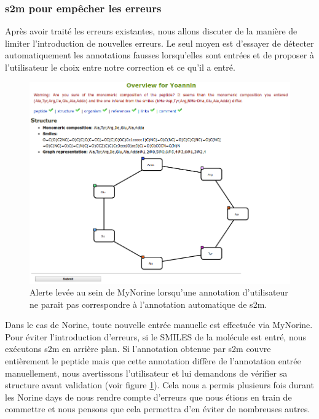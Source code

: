 \subsubsection{s2m pour empêcher les erreurs}

Après avoir traité les erreurs existantes, nous allons discuter de la manière de limiter l'introduction de nouvelles erreurs.
Le seul moyen est d'essayer de détecter automatiquement les annotations fausses lorsqu'elles sont entrées et de proposer à l'utilisateur le choix entre notre correction et ce qu'il a entré.

\begin{figure}[h!]
  \begin{center}
    \includegraphics[width=450px]{Figures/contributions/warning.png}
    \caption{\label{warning}Alerte levée au sein de MyNorine lorsqu'une annotation d'utilisateur ne parait pas correspondre à l'annotation automatique de s2m.}
  \end{center}
\end{figure}

Dans le cas de Norine, toute nouvelle entrée manuelle est effectuée via MyNorine.
Pour éviter l'introduction d'erreurs, si le SMILES de la molécule est entré, nous exécutons s2m en arrière plan.
Si l'annotation obtenue par s2m couvre entièrement le peptide mais que cette annotation diffère de l'annotation entrée manuellement, nous avertissons l'utilisateur et lui demandons de vérifier sa structure avant validation (voir figure \ref{warning}).
Cela nous a permis plusieurs fois durant les Norine days de nous rendre compte d'erreurs que nous étions en train de commettre et nous pensons que cela permettra d'en éviter de nombreuses autres.

